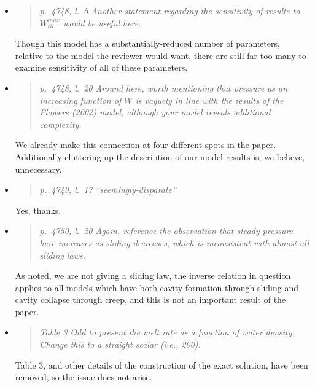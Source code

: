 \documentclass[11pt,reqno]{amsart}
\newcommand{\reply}[2]{
\medskip\medskip
\item  \begin{quote}
\emph{#1}
\end{quote}

\medskip
\noindent #2}
\begin{document}
\begin{itemize}
\reply{p.~4748, l.~5 Another statement regarding the sensitivity of results to $W_{til}^{max}$ would be useful here.}
{Though this model has a substantially-reduced number of parameters, relative to the model the reviewer would want, there are still far too many to examine sensitivity of all of these parameters.}

\reply{p.~4748, l.~20 Around here, worth mentioning that pressure as an increasing function of $W$ is vaguely in line with the results of the Flowers (2002) model, although your model reveals additional complexity.}
{We already make this connection at four different spots in the paper.  Additionally cluttering-up the description of our model results is, we believe, unnecessary.}

\reply{p.~4749, l.~17 ``seemingly-disparate''}
{Yes, thanks.}

\reply{p.~4750, l.~20 Again, reference the observation that steady pressure here increases as sliding decreases, which is inconsistent with almost all sliding laws.}
{As noted, we are not giving a sliding law, the inverse relation in question applies to all models which have both cavity formation through sliding and cavity collapse through creep, and this is not an important result of the paper.}

\reply{Table 3 Odd to present the melt rate as a function of water density. Change this to a
straight scalar (i.e., 200).}
{Table 3, and other details of the construction of the exact solution, have been removed, so the issue does not arise.}
\end{itemize}
\end{document}
